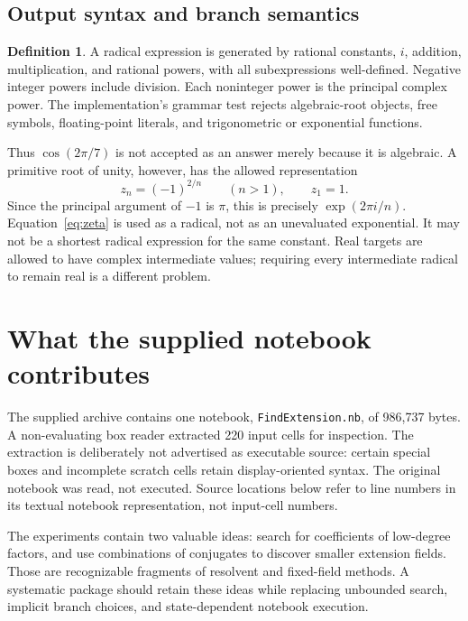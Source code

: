 \documentclass[11pt,a4paper]{article}
\newcommand{\code}[1]{\texttt{\small #1}}
\theoremstyle{definition}
\newtheorem{definition}[theorem]{Definition}
\begin{document}
\subsection{Output syntax and branch semantics}
\begin{definition}
A radical expression is generated by rational constants, $i$, addition,
multiplication, and rational powers, with all subexpressions well-defined.
Negative integer powers include division. Each noninteger power is the principal
complex power. The implementation's grammar test rejects algebraic-root objects,
free symbols, floating-point literals, and trigonometric or exponential
functions.
\end{definition}
Thus $\cos(2\pi/7)$ is not accepted as an answer merely because it is algebraic.
A primitive root of unity, however, has the allowed representation
\begin{equation}\label{eq:zeta}
 z_n=(-1)^{2/n}\qquad(n>1),\qquad z_1=1.
\end{equation}
Since the principal argument of $-1$ is $\pi$, this is precisely
$\exp(2\pi i/n)$. Equation~\eqref{eq:zeta} is used as a radical, not as an
unevaluated exponential. It may not be a shortest radical expression for the
same constant. Real targets are allowed to have complex intermediate values;
requiring every intermediate radical to remain real is a different problem.

\section{What the supplied notebook contributes}
The supplied archive contains one notebook, \code{FindExtension.nb}, of 986,737
bytes. A non-evaluating box reader extracted 220 input cells for inspection.
The extraction is deliberately not advertised as executable source: certain
special boxes and incomplete scratch cells retain display-oriented syntax.
The original notebook was read, not executed. Source locations below refer to
line numbers in its textual notebook representation, not input-cell numbers.

The experiments contain two valuable ideas: search for coefficients of low-degree
factors, and use combinations of conjugates to discover smaller extension
fields. Those are recognizable fragments of resolvent and fixed-field methods.
A systematic package should retain these ideas while replacing unbounded search,
implicit branch choices, and state-dependent notebook execution.
\end{document}
